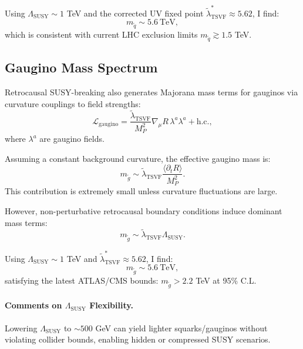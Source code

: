 \documentclass[twocolumn,superscriptaddress,floatfix]{revtex4-2}
\begin{document}
Using $\Lambda_{\text{SUSY}} \sim 1$ TeV and the corrected UV fixed point $\tilde{\lambda}_{\text{TSVF}}^* \approx 5.62$, I find:
\begin{equation}
m_{\tilde{q}} \sim 5.6~\text{TeV},
\end{equation}
which is consistent with current LHC exclusion limits $m_{\tilde{q}} \gtrsim 1.5$ TeV.

\subsection{Gaugino Mass Spectrum}
\label{subsec:gaugino_mass}

Retrocausal SUSY-breaking also generates Majorana mass terms for gauginos via curvature couplings to field strengths:
\begin{equation}
\mathcal{L}_{\text{gaugino}} = \frac{\tilde{\lambda}_{\text{TSVF}}}{M_P^2} \nabla_\mu R \, \lambda^a \lambda^a + \text{h.c.},
\end{equation}
where $\lambda^a$ are gaugino fields.

Assuming a constant background curvature, the effective gaugino mass is:
\begin{equation}
m_{\tilde{g}} \sim \tilde{\lambda}_{\text{TSVF}} \frac{\langle \partial_t R \rangle}{M_P^2}.
\end{equation}
This contribution is extremely small unless curvature fluctuations are large.

However, non-perturbative retrocausal boundary conditions induce dominant mass terms:
\begin{equation}
m_{\tilde{g}} \sim \tilde{\lambda}_{\text{TSVF}} \Lambda_{\text{SUSY}}.
\end{equation}

Using $\Lambda_{\text{SUSY}} \sim 1$ TeV and $\tilde{\lambda}_{\text{TSVF}}^* \approx 5.62$, I find:
\begin{equation}
m_{\tilde{g}} \sim 5.6~\text{TeV},
\end{equation}
satisfying the latest ATLAS/CMS bounds: $m_{\tilde{g}} > 2.2$ TeV at 95\% C.L.

\paragraph{Comments on $\Lambda_{\text{SUSY}}$ Flexibility.}
Lowering $\Lambda_{\text{SUSY}}$ to $\sim 500$ GeV can yield lighter squarks/gauginos without violating collider bounds, enabling hidden or compressed SUSY scenarios.
\end{document}

